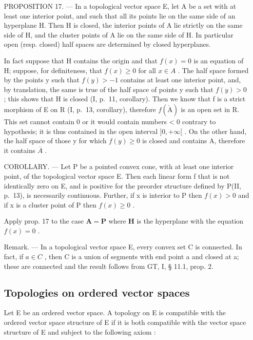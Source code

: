 PROPOSITION 17. --- In a topological vector space E, let A be a set with at least one interior point, and such that all its points lie on the same side of an hyperplane H. Then H is closed, the interior points of A lie strictly on the same side of H, and the cluster points of A lie on the same side of H. In particular open (resp. closed) half spaces are determined by closed hyperplanes.

In fact suppose that H contains the origin and that \(f(x) = 0\) is an equation of H; suppose, for definiteness, that \(f(x) \geqslant 0\) for all \(x \in A\) . The half space formed by the points y such that \(f(y) > -1\) contains at least one interior point, and, by translation, the same is true of the half space of points y such that \(f(y) > 0\) ; this shows that H is closed (I, p.~11, corollary). Then we know that f is a strict morphism of E on R (I, p.~13, corollary), therefore \(f(\mathring{\mathrm{A}})\) is an open set in R. This set cannot contain 0 or it would contain numbers \textless{} 0 contrary to hypothesis; it is thus contained in the open interval \(\bigg]0, +\infty[\) . On the other hand, the half space of those y for which \(f(y) \geqslant 0\) is closed and contains A, therefore it contains \(\overline{A}\) .

COROLLARY. --- Let P be a pointed convex cone, with at least one interior point, of the topological vector space E. Then each linear form f that is not identically zero on E, and is positive for the preorder structure defined by P(II, p.~13), is necessarily continuous. Further, if x is interior to P then \(f(x) > 0\) and if x is a cluster point of P then \(f(x) \geqslant 0\) .

Apply prop. 17 to the case \(\mathbf{A} = \mathbf{P}\) where \(\mathbf{H}\) is the hyperplane with the equation \(f(x) = 0\) .

Remark. --- In a topological vector space E, every convex set C is connected. In fact, if \(a \in C\) , then C is a union of segments with end point a and closed at a; these are connected and the result follows from GT, I, § 11.1, prop. 2.

\subsection{Topologies on ordered vector spaces}

Let E be an ordered vector space. A topology on E is compatible with the ordered vector space structure of E if it is both compatible with the vector space structure of E and subject to the following axiom :

